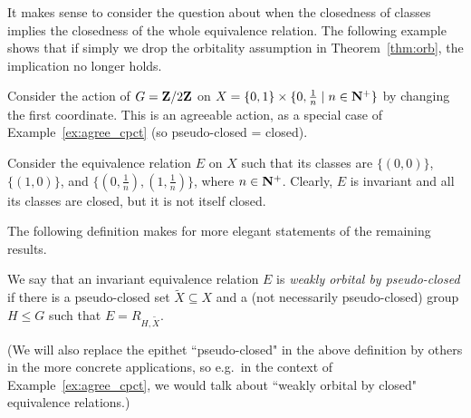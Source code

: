 	It makes sense to consider the question about when the closedness of classes implies the closedness of the whole equivalence relation. The following example shows that if simply we drop the orbitality assumption in Theorem~\ref{thm:orb}, the implication no longer holds.
	\begin{ex}
		\label{ex:not_orbital}
		Consider the action of $G={\bf Z}/2{\bf Z}$ on $X=\{0,1\}\times \{0,\frac{1}{n}\mid n\in {\bf N}^+ \}$ by changing the first coordinate. This is an agreeable action, as a special case of Example~\ref{ex:agree_cpct} (so pseudo-closed = closed).
		
		Consider the equivalence relation $E$ on $X$ such that its classes are $\{(0,0)\}$, $\{(1,0)\}$, and $\{(0,\frac{1}{n}),(1,\frac{1}{n})\}$, where $n\in {\bf N}^+$. Clearly, $E$ is invariant and all its classes are closed, but it is not itself closed.\xqed{\lozenge}
	\end{ex}
	
	The following definition makes for more elegant statements of the remaining results.
	
	\begin{dfn}
		We say that an invariant equivalence relation $E$ is \emph{weakly orbital by pseudo-closed} if there is a pseudo-closed set $\tilde X\subseteq X$ and a (not necessarily pseudo-closed) group $H\leq G$ such that $E=R_{H,\tilde X}$.\xqed{\lozenge}
	\end{dfn}
	
	(We will also replace the epithet ``pseudo-closed" in the above definition by others in the more concrete applications, so e.g.\ in the context of Example~\ref{ex:agree_cpct}, we would talk about ``weakly orbital by closed" equivalence relations.)
	
